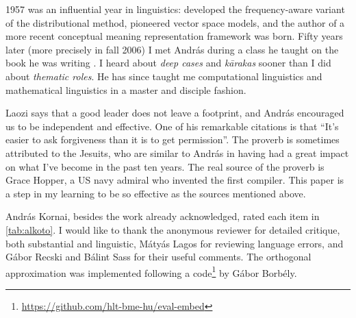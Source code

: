 \documentclass[11pt]{article}
\begin{document}
1957 was an influential year in linguistics: \cite{Harris:1957} developed the
frequency-aware variant of the distributional method, \cite{Osgood:1957}
pioneered vector space models, and the author of a more recent conceptual
meaning representation framework \citep{Kornai:2010,Kornai:2018} was born.
Fifty years later (more precisely in fall 2006) I met András during a class
he taught on the book he was writing \citep{Kornai:2007}. I heard about
\emph{deep cases} and \emph{k\={a}rakas} sooner than I did about \emph{thematic
roles}. He has since taught me computational linguistics and mathematical
linguistics in a master and disciple fashion.

Laozi says that a good leader does not leave a footprint, and András encouraged
us to be independent and effective. One of his remarkable citations is that
``It's easier to ask forgiveness than it is to get permission''. The proverb is
sometimes attributed to the Jesuits, who are similar to András in having had a
great impact on what I've become in the past ten years. The real source of the
proverb is Grace Hopper, a US navy admiral who invented the first compiler.
This paper is a step in my learning to be so effective as the sources
mentioned above.

\bigskip

András Kornai, besides the work already acknowledged, rated each item in
\cref{tab:alkoto}. I would like to thank the anonymous reviewer for detailed
critique, both substantial and linguistic, Mátyás Lagos for reviewing language
errors, and Gábor Recski and Bálint Sass for
their useful comments. The orthogonal approximation was implemented following a
code\footnote{\url{https://github.com/hlt-bme-hu/eval-embed}} by Gábor Borbély.

 
 
\end{document}
